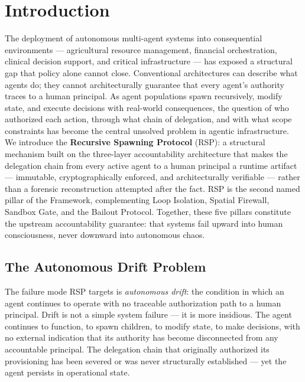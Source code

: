 \section{Introduction}
\label{sec:rs-intro}

The deployment of autonomous multi-agent systems into consequential environments — agricultural resource management, financial orchestration, clinical decision support, and critical infrastructure — has exposed a structural gap that policy alone cannot close. Conventional architectures can describe what agents do; they cannot architecturally guarantee that every agent's authority traces to a human principal. As agent populations spawn recursively, modify state, and execute decisions with real-world consequences, the question of who authorized each action, through what chain of delegation, and with what scope constraints has become the central unsolved problem in agentic infrastructure. We introduce the \textbf{Recursive Spawning Protocol} (RSP): a structural mechanism built on the \bxthree three-layer accountability architecture that makes the delegation chain from every active agent to a human principal a runtime artifact — immutable, cryptographically enforced, and architecturally verifiable — rather than a forensic reconstruction attempted after the fact. RSP is the second named pillar of the \bxthree Framework, complementing Loop Isolation, Spatial Firewall, Sandbox Gate, and the Bailout Protocol. Together, these five pillars constitute the upstream accountability guarantee: that \bxthree systems fail upward into human consciousness, never downward into autonomous chaos.

\subsection{The Autonomous Drift Problem}

The failure mode RSP targets is \emph{autonomous drift}: the condition in which an agent continues to operate with no traceable authorization path to a human principal. Drift is not a simple system failure — it is more insidious. The agent continues to function, to spawn children, to modify state, to make decisions, with no external indication that its authority has become disconnected from any accountable principal. The delegation chain that originally authorized its provisioning has been severed or was never structurally established — yet the agent persists in operational state.

